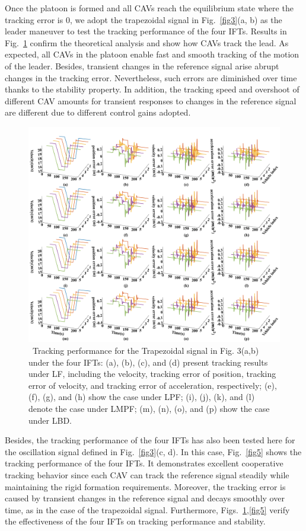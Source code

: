 \documentclass[a4paper]{cas-sc}
\begin{document}
Once the platoon is formed and all CAVs reach the equilibrium state where the tracking error is 0, we adopt the trapezoidal signal in Fig.~\ref{fig3}(a, b) as the leader maneuver to test the tracking performance of the four IFTs. Results in Fig.~\ref{fig4} confirm the theoretical analysis and show how CAVs track the lead. As expected, all CAVs in the platoon enable fast and smooth tracking of the motion of the leader. Besides, transient changes in the reference signal arise abrupt changes in the tracking error. Nevertheless, such errors are diminished over time thanks to the stability property. In addition, the tracking speed and overshoot of different CAV amounts for transient responses to changes in the reference signal are different due to different control gains adopted.

\begin{figure}
  \centering
  \includegraphics[width=14cm]{figs/fig4.png}
  \caption{~Tracking performance for the Trapezoidal signal in Fig. 3(a,b) under the four IFTs: (a), (b), (c), and (d) present tracking results under LF, including the velocity, tracking error of position, tracking error of velocity, and tracking error of acceleration, respectively; (e), (f), (g), and (h) show the case under LPF; (i), (j), (k), and (l) denote the case under LMPF; (m), (n), (o), and (p) show the case under LBD.}
  \label{fig4}
\end{figure}


Besides, the tracking performance of the four IFTs has also been tested here for the oscillation signal defined in Fig.~\ref{fig3}(c, d). In this case, Fig.~\ref{fig5} shows the tracking performance of the four IFTs. It demonstrates excellent cooperative tracking behavior since each CAV can track the reference signal steadily while maintaining the rigid formation requirements. Moreover, the tracking error is caused by transient changes in the reference signal and decays smoothly over time, as in the case of the trapezoidal signal. Furthermore, Figs.~\ref{fig4},\ref{fig5} verify the effectiveness of the four IFTs on tracking performance and stability.
\end{document}
